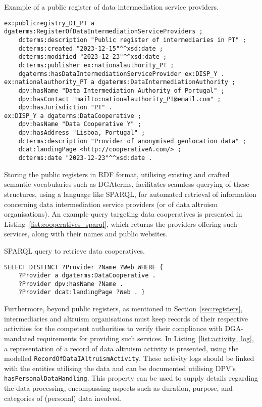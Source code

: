 \begin{listing}[ht]
\caption{Example of a public register of data intermediation service providers.}
\label{list:intermediary_register}
\begin{verbatim}
ex:publicregistry_DI_PT a dgaterms:RegisterOfDataIntermediationServiceProviders ;
    dcterms:description "Public register of intermediaries in PT" ;
    dcterms:created "2023-12-15"^^xsd:date ; 
    dcterms:modified "2023-12-23"^^xsd:date ;
    dcterms:publisher ex:nationalauthority_PT ;
    dgaterms:hasDataIntermediationServiceProvider ex:DISP_Y .
ex:nationalauthority_PT a dgaterms:DataIntermediationAuthority ;
    dpv:hasName "Data Intermediation Authority of Portugal" ;
    dpv:hasContact "mailto:nationalauthority_PT@email.com" ;
    dpv:hasJurisdiction "PT" .
ex:DISP_Y a dgaterms:DataCooperative ;
    dpv:hasName "Data Cooperative Y" ;
    dpv:hasAddress "Lisboa, Portugal" ;
    dcterms:description "Provider of anonymised geolocation data" ;
    dcat:landingPage <http://cooperativeA.com/> ;
    dcterms:date "2023-12-23"^^xsd:date .
\end{verbatim}
\end{listing}

Storing the public registers in RDF format, utilising existing and crafted semantic vocabularies such as DGAterms, facilitates seamless querying of these structures, using a language like SPARQL, for automated retrieval of information concerning data intermediation service providers (or of data altruism organisations).
An example query targeting data cooperatives is presented in Listing~\ref{list:cooperatives_sparql}, which returns the providers offering such services, along with their names and public websites.

\begin{listing}[ht]
\caption{SPARQL query to retrieve data cooperatives.}
\label{list:cooperatives_sparql}
\begin{verbatim}
SELECT DISTINCT ?Provider ?Name ?Web WHERE {
    ?Provider a dgaterms:DataCooperative .
    ?Provider dpv:hasName ?Name .
    ?Provider dcat:landingPage ?Web . }
\end{verbatim}
\end{listing}

Furthermore, beyond public registers, as mentioned in Section~\ref{sec:registers}, intermediaries and altruism organisations must keep records of their respective activities for the competent authorities to verify their compliance with DGA-mandated requirements for providing such services.
In Listing~\ref{list:activity_log}, a representation of a record of data altruism activity is presented, using the modelled \texttt{RecordOfDataIAltruismActivity}.
These activity logs should be linked with the entities utilising the data and can be documented utilising DPV's \texttt{hasPersonalDataHandling}. 
This property can be used to supply details regarding the data processing, encompassing aspects such as duration, purpose, and categories of (personal) data involved.


